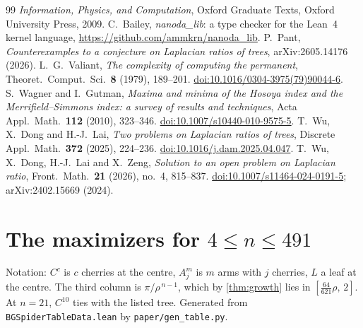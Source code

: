 \documentclass[11pt]{article}
\theoremstyle{definition}
\begin{document}
\begin{thebibliography}{99}
\emph{Information, Physics, and Computation},
Oxford Graduate Texts, Oxford University Press, 2009.
 C.~Bailey, \emph{nanoda\_lib}: a type checker for the Lean~4 kernel
language, \url{https://github.com/ammkrn/nanoda_lib}.
 P.~Pant,
\emph{Counterexamples to a conjecture on Laplacian ratios of trees},
arXiv:2605.14176 (2026).
 L.~G.~Valiant,
\emph{The complexity of computing the permanent},
Theoret.\ Comput.\ Sci.\ \textbf{8} (1979), 189--201.
\href{https://doi.org/10.1016/0304-3975(79)90044-6}{doi:10.1016/0304-3975(79)90044-6}.
 S.~Wagner and I.~Gutman,
\emph{Maxima and minima of the Hosoya index and the Merrifield--Simmons index: a survey of results and
techniques},
Acta Appl.\ Math.\ \textbf{112} (2010), 323--346.
\href{https://doi.org/10.1007/s10440-010-9575-5}{doi:10.1007/s10440-010-9575-5}.
 T.~Wu, X.~Dong and H.-J.~Lai,
\emph{Two problems on Laplacian ratios of trees},
Discrete Appl.\ Math.\ \textbf{372} (2025), 224--236.
\href{https://doi.org/10.1016/j.dam.2025.04.047}{doi:10.1016/j.dam.2025.04.047}.
 T.~Wu, X.~Dong, H.-J.~Lai and X.~Zeng,
\emph{Solution to an open problem on Laplacian ratio},
Front.\ Math.\ \textbf{21} (2026), no.~4, 815--837.
\href{https://doi.org/10.1007/s11464-024-0191-5}{doi:10.1007/s11464-024-0191-5};
arXiv:2402.15669 (2024).
\end{thebibliography}

\appendix
\clearpage
\section{The maximizers for $4\le n\le491$}\label{app:table}

Notation: $C^{c}$ is $c$ cherries at the centre, $A_j^{m}$ is $m$ arms with $j$ cherries, $L$ a leaf at
the centre. The third column is $\pi/\rho^{\,n-1}$, which by \cref{thm:growth} lies in
$[\tfrac{64}{621}\rho,\,2]$. At $n=21$, $C^{10}$ ties with the listed tree.
Generated from \texttt{BGSpiderTableData.lean} by \texttt{paper/gen\_table.py}.

{\small
\setlength{\tabcolsep}{4pt}

}
\end{document}
